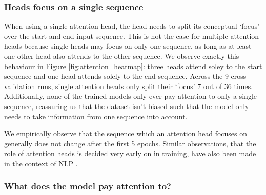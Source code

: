 


\subsubsection{Heads focus on a single sequence} 
When using a single attention head, the head needs to split its conceptual `focus' over the start and end input sequence. This is not the case for multiple attention heads because single heads may focus on only one sequence, as long as at least one other head also attends to the other sequence. We observe exactly this behaviour in Figure \ref{fig:attention_heatmap}: three heads attend soley to the start sequence and one head attends solely to the end sequence. Across the 9 cross-validation runs, single attention heads only split their `focus' 7 out of 36 times. Additionally, none of the trained models only ever pay attention to only a single sequence, reassuring us that the dataset isn't biased such that the model only needs to take information from one sequence into account. 

We empirically observe that the sequence which an attention head focuses on generally does not change after the first 5 epochs. Similar observations, that the role of attention heads is decided very early on in training, have also been made in the context of NLP \cite{sixteenheads}.

\subsubsection{What does the model pay attention to?}

